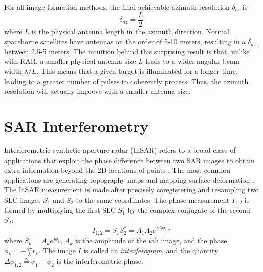 For all image formation methods, the final achievable azimuth resolution $\delta_{az}$ is
\begin{equation}
	\delta_{az} = \frac{L}{2}
\end{equation}
where $L$ is the physical antenna length in the azimuth direction.
Normal spaceborne satellites have antennas on the order of 5-10 meters, resulting in a $\delta_{az} $ between 2.5-5 meters.
The intuition behind this surprising result is that, unlike with RAR, a smaller physical antenna size $L$ leads to a wider angular beam width $ \lambda / L$. This means that a given target is illuminated for a longer time, leading to a greater number of pulses to coherently process. Thus, the azimuth resolution will actually improve with a smaller antenna size.



\section{SAR Interferometry}

Interferometric synthetic aperture radar (InSAR) refers to a broad class of applications that exploit the phase difference between two SAR images to obtain extra information beyond the 2D locations of points \citep{Bamler1998SyntheticApertureRadar}. The most common applications are generating topography maps \citep{Graham1974SyntheticInterferometerRadar, Zebker1986TopographicMappingInterferometric} and mapping surface deformation \citep{Goldstein1987InterferometricRadarMeasurement, Gabriel1989MappingSmallElevation, Li1990StudiesMultibaselineSpaceborne, Massonnet1993DisplacementFieldLanders, Rosen2000SyntheticApertureRadar}. 
The InSAR measurement is made after precisely coregistering and resampling two SLC images $S_1$ and $S_2$ to the same coordinates. The phase measurement $I_{1,2}$ is formed by multiplying the first SLC $S_1$ by the complex conjugate of the second $S_2$: 
\begin{equation}
I_{1,2} = S_1 S_2^{*} = A_1 A_2 e^{j \Delta \phi_{1,2}}  \label{eq:ch2-conj-mult}
\end{equation}
where $S_k = A_k e^{j \phi_k}$, $A_k$ is the amplitude of the $k$th image, and the phase $\phi_k = -\frac{4 \pi}{\lambda} r_k$. The image $I$ is called an \emph{interferogram},  and the quantity $\Delta \phi_{1,2} \triangleq  \phi_1 - \phi_2$ is the interferometric phase.

